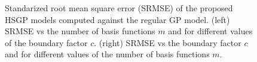 \documentclass[]{interact}
\theoremstyle{plain}%
\theoremstyle{definition}
\theoremstyle{remark}
\begin{document}
\begin{figure}
\centering
{}
\caption{Standarized root mean square error (SRMSE) of the proposed HSGP models computed against the regular GP model. (left) SRMSE vs the number of basis functions $m$ and for different values of the boundary factor $c$. (right) SRMSE vs the boundary factor $c$ and for different values of the number of basis functions $m$. }
  \label{fig5_MSE_vs_J}
\end{figure}
\end{document}
